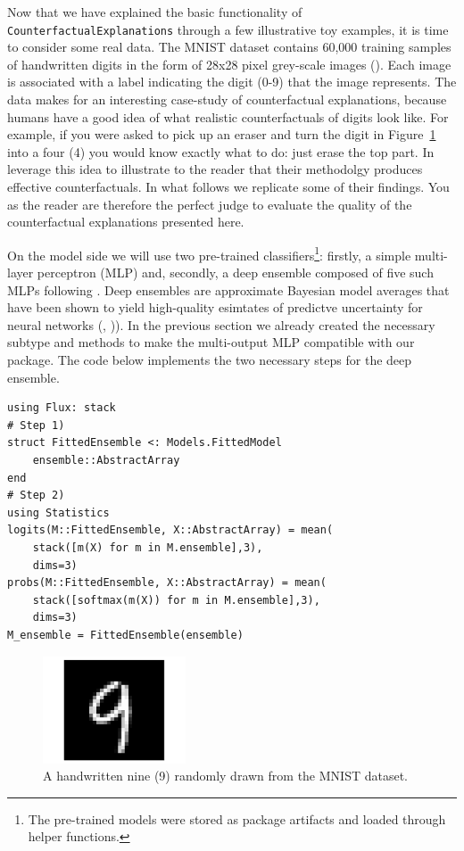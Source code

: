 \documentclass{juliacon}
\begin{document}
Now that we have explained the basic functionality of
\texttt{CounterfactualExplanations} through a few illustrative toy
examples, it is time to consider some real data. The MNIST dataset
contains 60,000 training samples of handwritten digits in the form of
28x28 pixel grey-scale images (\cite{lecun1998mnist}). Each image is
associated with a label indicating the digit (0-9) that the image
represents. The data makes for an interesting case-study of
counterfactual explanations, because humans have a good idea of what
realistic counterfactuals of digits look like. For example, if you were
asked to pick up an eraser and turn the digit in
Figure~\ref{fig-mnist-orig} into a four (4) you would know exactly what
to do: just erase the top part. In \cite{schut2021generating} leverage
this idea to illustrate to the reader that their methodolgy produces
effective counterfactuals. In what follows we replicate some of their
findings. You as the reader are therefore the perfect judge to evaluate
the quality of the counterfactual explanations presented here.

On the model side we will use two pre-trained classifiers\footnote{The
  pre-trained models were stored as package artifacts and loaded through
  helper functions.}: firstly, a simple multi-layer perceptron (MLP)
and, secondly, a deep ensemble composed of five such MLPs following
\cite{schut2021generating}. Deep ensembles are approximate Bayesian
model averages that have been shown to yield high-quality esimtates of
predictve uncertainty for neural networks (\cite{wilson2019case.pdf},
\cite{lakshminarayanan2016simple})). In the previous section we already
created the necessary subtype and methods to make the multi-output MLP
compatible with our package. The code below implements the two necessary
steps for the deep ensemble.

\begin{lstlisting}
using Flux: stack
# Step 1)
struct FittedEnsemble <: Models.FittedModel
    ensemble::AbstractArray
end
# Step 2)
using Statistics
logits(M::FittedEnsemble, X::AbstractArray) = mean(
    stack([m(X) for m in M.ensemble],3), 
    dims=3)
probs(M::FittedEnsemble, X::AbstractArray) = mean(
    stack([softmax(m(X)) for m in M.ensemble],3),
    dims=3)
M_ensemble = FittedEnsemble(ensemble)
\end{lstlisting}

\begin{figure}

{\centering \includegraphics[width=1.66667in,height=1.25in]{www/mnist_original.png}

}

\caption{\label{fig-mnist-orig}A handwritten nine (9) randomly drawn
from the MNIST dataset.}

\end{figure}
\end{document}
